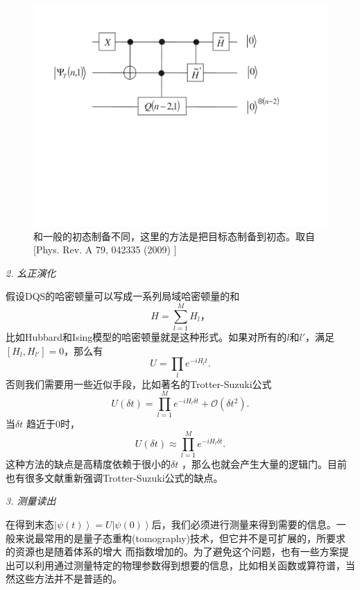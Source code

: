         \begin{figure}[htbp]
            \begin{center}
              \includegraphics[width= 0.8\columnwidth]{figures/initial.pdf}
              \caption{和一般的初态制备不同，这里的方法是把目标态制备到初态。取自[Phys. Rev. A 79, 042335 (2009)\cite{ini4}
]
              }
              \label{schematic}
            \end{center}
        \end{figure}

\emph{2. 幺正演化}

假设DQS的哈密顿量可以写成一系列局域哈密顿量的和
\begin{equation}
         H = \sum_{l=1}^MH_l，
 \end{equation}
 比如Hubbard和Ising模型的哈密顿量就是这种形式。如果对所有的$l$和$l'$，满足$[H_l, H_{l'}]=0$，那么有
 \begin{equation}
         U = \prod_l e^{-iH_lt}.
 \end{equation}
 否则我们需要用一些近似手段，比如著名的Trotter-Suzuki公式\cite{trotter}
 \begin{equation}\label{trotter}
 U(\delta t)  = \prod\limits_{l=1}^M e^{-iH_l\delta t}+\mathcal {O}(\delta t^2).
\end{equation}
当$\delta t$ 趋近于0时，
 \begin{equation}\label{trotter}
 U(\delta t) \approx  \prod\limits_{l=1}^M e^{-iH_l\delta t}.
\end{equation}
这种方法的缺点是高精度依赖于很小的$\delta t$ ，那么也就会产生大量的逻辑门。目前也有很多文献重新强调Trotter-Suzuki公式的缺点\cite{tro1,tro2}。

\emph{3. 测量读出}

在得到末态$\left\vert \psi(t) \right\rangle = U\left\vert \psi(0) \right\rangle$后，我们必须进行测量来得到需要的信息。一般来说最常用的是量子态重构(tomography)技术，但它并不是可扩展的，所要求的资源也是随着体系的增大
而指数增加的。为了避免这个问题，也有一些方案提出可以利用通过测量特定的物理参数得到想要的信息，比如相关函数或算符谱\cite{ini2}，当然这些方法并不是普适的。

